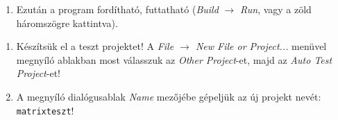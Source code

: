 \begin{frame}
  \begin{enumerate}
    \setcounter{enumi}{\theqt}
    \item Ezután a program fordítható, futtatható (\emph{Build} $\to$ \emph{Run}, vagy a zöld háromszögre kattintva).\\
    \setcounter{qt}{\theenumi}
  \end{enumerate}
\end{frame}

\begin{frame}
  \begin{enumerate}
    \setcounter{enumi}{\theqt}
    \item Készítsük el a teszt projektet! A \emph{File $\to$ New File or Project...} menüvel megnyíló ablakban most válasszuk az \emph{Other Project}-et, majd az \emph{Auto Test Project}-et!\\
    \item A megnyíló dialógusablak \emph{Name} mezőjébe gépeljük az új projekt nevét: \texttt{matrixteszt}!
    \setcounter{qt}{\theenumi}
  \end{enumerate}
\end{frame}

